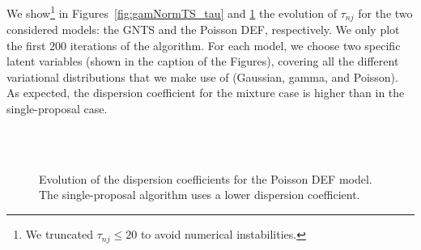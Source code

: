 \documentclass[]{article}
\begin{document}
We show\footnote{We truncated $\tau_{nj}\leq 20$ to avoid numerical instabilities.} in Figures~\ref{fig:gamNormTS_tau} and \ref{fig:poissonDEF_tau} the evolution of $\tau_{nj}$ for the two considered models: the \gls{GNTS} and the Poisson \gls{DEF}, respectively. We only plot the first $200$ iterations of the algorithm. For each model, we choose two specific latent variables (shown in the caption of the Figures), covering all the different variational distributions that we make use of (Gaussian, gamma, and Poisson).
%
As expected, the dispersion coefficient for the mixture case is higher than in the single-proposal case.

\begin{figure}[h]
  \centering
  \\
  \\
  \caption{Evolution of the dispersion coefficients for the Poisson \gls{DEF} model. The single-proposal algorithm uses a lower dispersion coefficient.\label{fig:poissonDEF_tau}}
\end{figure}
\end{document}
